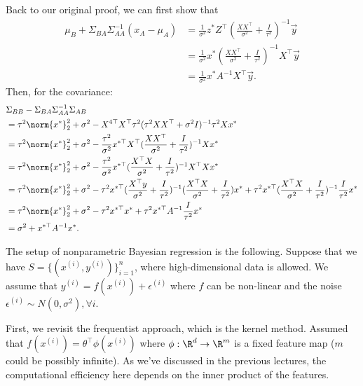 Back to our original proof, we can first show that 
\begin{equation} \label{eq1}
	\begin{split}
		\mu_B + \Sigma_{BA} \Sigma_{AA}^{-1} (x_A - \mu_A)   & = \frac{1}{\sigma^2} z^* Z^\top (\frac{XX^\top}{\sigma^2} + \frac{I}{\tau^2})^{-1} \overrightarrow{y}  \\
		& = \frac{1}{\sigma^2} x^* (\frac{XX^\top}{\sigma^2} + \frac{I}{\tau^2})^{-1} X^\top \overrightarrow{y} \\
		& = \frac{1}{\sigma^2} x^* A^{-1} X^\top \overrightarrow{y}.
	\end{split}
\end{equation}
Then, for the covariance: 
\begin{equation} \label{eq1}
	\begin{split}
		&\Sigma_{BB} - \Sigma_{BA} \Sigma_{AA}^{-1} \Sigma_{AB} \\
		& = \tau^2 \norm{x^*}_2^2 + \sigma^2 - X^{4\top} X^\top \tau^2 (\tau^2 XX^\top + \sigma^2 I)^{-1} \tau^2 Xx^*\\
		& = \tau^2 \norm{x^*}_2^2 + \sigma^2 - \frac{\tau^2}{\sigma^2} x^{*\top}X^\top (\frac{XX^\top}{\sigma^2} + \frac{I}{\tau^2})^{-1}Xx^*\\
		& = \tau^2 \norm{x^*}_2^2 + \sigma^2 - \frac{\tau^2}{\sigma^2} x^{*\top} (\frac{X^\top X}{\sigma^2} + \frac{I}{\tau^2})^{-1} X^\top X x^*\\
		& = \tau^2 \norm{x^*}_2^2 + \sigma^2 - \tau^2 x^{*\top} (\frac{X^\top y}{\sigma^2} + \frac{I}{\tau^2})^{-1} (\frac{X^\top X}{\sigma^2} + \frac{I}{\tau^2}) x^* + \tau^2 x^{*\top} (\frac{X^\top X}{\sigma^2} + \frac{I}{\tau^2})^{-1} \frac{I}{\tau^2} x^*\\
		& = \tau^2 \norm{x^*}_2^2 + \sigma^2 - \tau^2 x^{*\top} x^* + \tau^2 x^{*\top} A^{-1} \frac{I}{\tau^2} x^*\\ 
		& = \sigma^2 + x^{*\top} A^{-1} x^*.
	\end{split}
\end{equation}

The setup of nonparametric Bayesian regression is the following. Suppose that we have $S = \{(x^{(i)}, y^{(i)})\}_{i = 1}^n$, where high-dimensional data is allowed. We assume that $y^{(i)} = f(x^{(i)}) + \epsilon^{(i)}$ where $f$ can be non-linear and the noise $\epsilon^{(i)} \sim N(0, \sigma^2), \forall i$.

First, we revisit the frequentist approach, which is the kernel method. Assumed that 
$f(x^{(i)}) = \theta^\top \phi(x^{(i)})$ where $\phi: \R^d \rightarrow \R^m$ is a fixed feature map ($m$ could be possibly infinite). As  we've discussed in the previous lectures, the computational efficiency here depends on the inner product of the features. 

